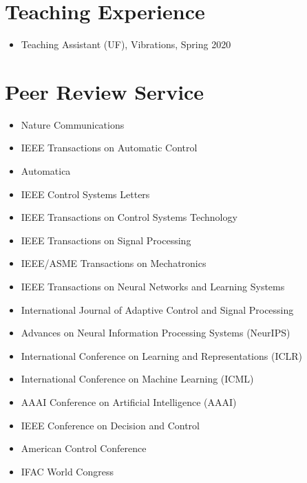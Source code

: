 \documentclass[10pt, letterpaper]{article}
\begin{document}
\section{Teaching Experience}

\begin{itemize}
\item{Teaching Assistant (UF), Vibrations, Spring 2020}
\end{itemize}




\section{Peer Review Service}

\begin{itemize}
    \setlength{\itemsep}{0pt} %
    \item Nature Communications
    \item IEEE Transactions on Automatic Control
    \item Automatica
    \item IEEE Control Systems Letters
    \item IEEE Transactions on Control Systems Technology
    \item IEEE Transactions on Signal Processing
    \item IEEE/ASME Transactions on Mechatronics
    \item IEEE Transactions on Neural Networks and Learning Systems
    \item International Journal of Adaptive Control and Signal Processing
    \item Advances on Neural Information Processing Systems (NeurIPS)
    \item International Conference on Learning and Representations (ICLR)
    \item International Conference on Machine Learning (ICML)
    \item AAAI Conference on Artificial Intelligence (AAAI)
    \item IEEE Conference on Decision and Control
    \item American Control Conference
    \item IFAC World Congress
\end{itemize}

    

    
\end{document}
